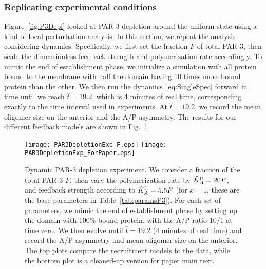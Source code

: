 \documentclass[11pt]{article}
\newcommand{\6}[1]{#1_{\text{6}}}
\newcommand{\3}[1]{#1_{\text{3}}}
\begin{document}
\subsubsection{Replicating experimental conditions}
Figure\ \ref{fig:P3Depl} looked at PAR-3 depletion around the uniform state using a kind of local perturbation analysis. In this section, we repeat the analysis considering dynamics. Specifically, we first set the fraction $F$ of total PAR-3, then scale the dimensionless feedback strength and polymerization rate accordingly. To mimic the end of establishment phase, we initialize a simulation with all protein bound to the membrane with half the domain having 10 times more bound protein than the other. We then run the dynamics\ \eqref{eq:SingleSpec} forward in time until we reach $\hat t = 19.2$, which is 4 minutes of real time, corresponding exactly to the time interval used in experiments. At $\hat t = 19.2$, we record the mean oligomer size on the anterior and the A/P asymmetry. The results for our different feedback models are shown in Fig.\ \ref{fig:P3DeplF}

\begin{figure}
\centering
\texttt{[image: PAR3DepletionExp\_F.eps]}
\texttt{[image: PAR3DepletionExp\_ForPaper.eps]}
\caption{\label{fig:P3DeplF}Dynamic PAR-3 depletion experiment. We consider a fraction of the total PAR-3 $F$, then vary the polymerization rate by $\hat{K}^\text{p}_A=20F$, and feedback strength according to $\hat{K}^\text{f}_A=5.5F$ (for $x=1$, these are the base parameters in Table\ \ref{tab:paramsP3}). For each set of parameters, we mimic the end of establishment phase by setting up the domain with 100\% bound protein, with the A/P ratio 10/1  at time zero. We then evolve until $\hat t=19.2$ (4 minutes of real time) and record the A/P asymmetry and mean oligomer size on the anterior. The top plots compare the recruitment models to the data, while the bottom plot is a cleaned-up version for paper main text. }
\end{figure}
\end{document}
